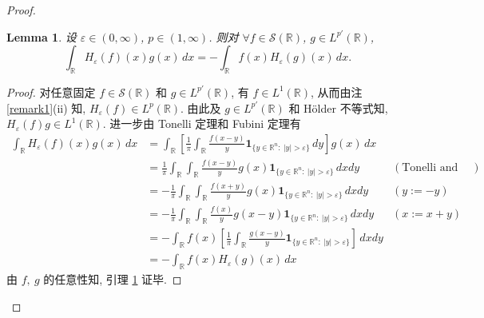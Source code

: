 \documentclass[a4paper,11pt]{article}
\newtheorem{lemma}[theorem]{Lemma}
\theoremstyle{definition}
\begin{document}
\begin{CJK*}{UTF8}{gbsn}
\begin{proof}
\begin{lemma} \label{lem3}
    设 $ \varepsilon \in (0, \infty) $, $ p \in (1, \infty) $. 
    则对 $ \forall f \in \mathcal{S}(\mathbb{R}) $, $ g \in L^{p'}(\mathbb{R}) $,
    $$
        \int_\mathbb{R} H_\varepsilon (f)(x) g(x) \, dx
            = -\int_\mathbb{R} f(x) H_\varepsilon (g)(x) \, dx.
    $$
\end{lemma}

\begin{proof}
    对任意固定 $ f \in \mathcal{S}(\mathbb{R}) $ 和 $ g \in L^{p'}(\mathbb{R}) $, 有 $ f \in L^1(\mathbb{R}) $, 
    从而由注 \ref{remark1}(ii) 知, $ H_\varepsilon (f) \in L^p(\mathbb{R}) $. 
    由此及 $ g \in L^{p'}(\mathbb{R}) $ 和 H\"older 不等式知, $ H_\varepsilon (f) g \in L^1(\mathbb{R}) $.
    进一步由 Tonelli 定理和 Fubini 定理有
    \begin{align*} 
        \int_\mathbb{R} H_\varepsilon (f)(x) g(x) \, dx
            &= \int_\mathbb{R} \left[ \frac{1}{\pi} \int_\mathbb{R} \frac{f(x - y)}{y} 
                \mathbf{1}_{\{y \in \mathbb{R}^n :\ |y| > \varepsilon\}} \, dy \right] g(x) \, dx \\
            &= \frac{1}{\pi} \int_\mathbb{R} \int_\mathbb{R}
                \frac{f(x - y)}{y} g(x) \mathbf{1}_{\{y \in \mathbb{R}^n :\ |y| > \varepsilon\}} \, dx dy  
                & (\text{Tonelli and Fubini}) \\
            &= -\frac{1}{\pi} \int_\mathbb{R} \int_\mathbb{R}
                \frac{f(x + y)}{y} g(x) \mathbf{1}_{\{y \in \mathbb{R}^n :\ |y| > \varepsilon\}} \, dx dy  
                & (y := -y) \\
            &= -\frac{1}{\pi} \int_\mathbb{R} \int_\mathbb{R}
                \frac{f(x)}{y} g(x - y) \mathbf{1}_{\{y \in \mathbb{R}^n :\ |y| > \varepsilon\}} \, dx dy  
                & (x := x + y) \\
            &= - \int_\mathbb{R} f(x) \left[ \frac{1}{\pi} \int_\mathbb{R}
                \frac{g(x - y)}{y} \mathbf{1}_{\{y \in \mathbb{R}^n :\ |y| > \varepsilon\}} \right] \, dx dy \\
            &= - \int_\mathbb{R} f(x) H_\varepsilon (g)(x) \, dx
    \end{align*}
    由 $ f,\ g $ 的任意性知, 引理 \ref{lem3} 证毕.
\end{proof}
    

\end{proof}
\end{CJK*}
\end{document}

